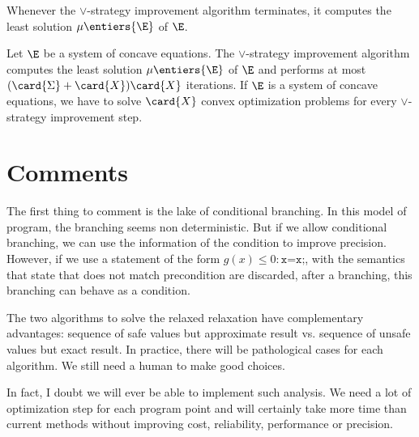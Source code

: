 \documentclass[a4paper, twoside, 10pt]{article}
\begin{document}
\begin{theorem}
    Whenever the $\vee$-strategy improvement algorithm terminates, it computes the least solution $\mu\entiers{\E}$ of $\E$.
\end{theorem}

\begin{theorem}
    Let $\E$ be a system of concave equations. The $\vee$-strategy improvement algorithm computes the least solution $\mu\entiers{\E}$ of $\E$ and performs at most $(\card{\Sigma}+\card{X})\card{X}$ iterations. If $\E$ is a system of concave equations, we have to solve $\card{X}$ convex optimization problems for every $\vee$-strategy improvement step.
\end{theorem}

\section{Comments}

The first thing to comment is the lake of conditional branching. In this model of program, the branching seems non deterministic. But if we allow conditional branching, we can use the information of the condition to improve precision. However, if we use a statement of the form $g(x) \leqslant 0 : \texttt{x=x;}$, with the semantics that state that does not match precondition are discarded, after a branching, this branching can behave as a condition.

The two algorithms to solve the relaxed relaxation have complementary advantages: sequence of safe values but approximate result vs. sequence of unsafe values but exact result. In practice, there will be pathological cases for each algorithm. We still need a human to make good choices.

In fact, I doubt we will ever be able to implement such analysis. We need a lot of optimization step for each program point and will certainly take more time than current methods without improving cost, reliability, performance or precision.
\end{document}
